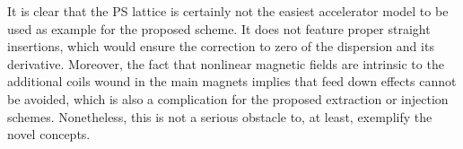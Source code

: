 \documentclass{article}
\begin{document}
It is clear that the PS lattice is certainly not the easiest accelerator model to be used as example for the proposed scheme. It does not feature proper straight insertions, which would ensure the correction to zero of the dispersion and its derivative. Moreover, the fact that nonlinear magnetic fields are intrinsic to the additional coils wound in the main magnets implies that feed down effects cannot be avoided, which is also a complication for the proposed extraction or injection schemes. Nonetheless, this is not a serious obstacle to, at least, exemplify the novel concepts. 
%
\end{document}
